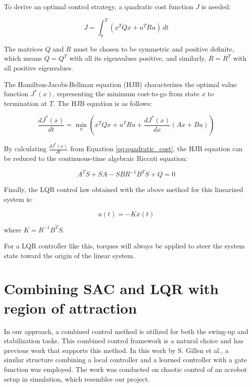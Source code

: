 To derive an optimal control strategy, a quadratic cost function \(J\) is needed:

\begin{equation}
  J = \int_0^{T} \left( x^T Q x + u^T R u \right) \, dt
  \label{eq:quadratic_cost}
\end{equation}

The matrices \(Q\) and \(R\) must be chosen to be symmetric and positive definite, which means \(Q = Q^T\) with all its eigenvalues positive, and similarly, \(R = R^T\) with all positive eigenvalues.

The Hamilton-Jacobi-Bellman equation (HJB) characterizes the optimal value function \(J^*(x)\), representing the minimum cost-to-go from state \(x\) to termination at \(T\). The HJB equation is as follows:

\begin{equation}
 \frac{dJ^*(x)}{dt} = \min_u \left( x^T Q x + u^T R u + \frac{dJ^*(x)}{dx} (Ax + Bu) \right)
 \label{eq:HJB}
\end{equation}

By calculating \(\frac{dJ^*(x)}{dt}\) from Equation \ref{eq:quadratic_cost}, the HJB equation can be reduced to the continuous-time algebraic Riccati equation:

\begin{equation}
 A^T S + SA - SBR^{-1}B^T S + Q = 0
\end{equation}

Finally, the LQR control law obtained with the above method for this linearized system is:

\begin{equation}
 u(t) = -K\overline{x}(t)
\end{equation}

where \(K = R^{-1}B^T S\).

For a LQR controller like this, torques will always be applied to steer the system state toward the origin of the linear system.


\section{Combining SAC and LQR with region of attraction}
In our approach, a combined control method is utilized for both the swing-up and stabilization tasks. This combined control framework is a natural choice and has previous work that supports this method. In this work by S. Gillen et al.\cite{gillen2020combining}, a similar structure combining a local controller and a learned controller with a gate function was employed. The work was conducted on chaotic control of an acrobot setup in simulation, which resembles our project.

